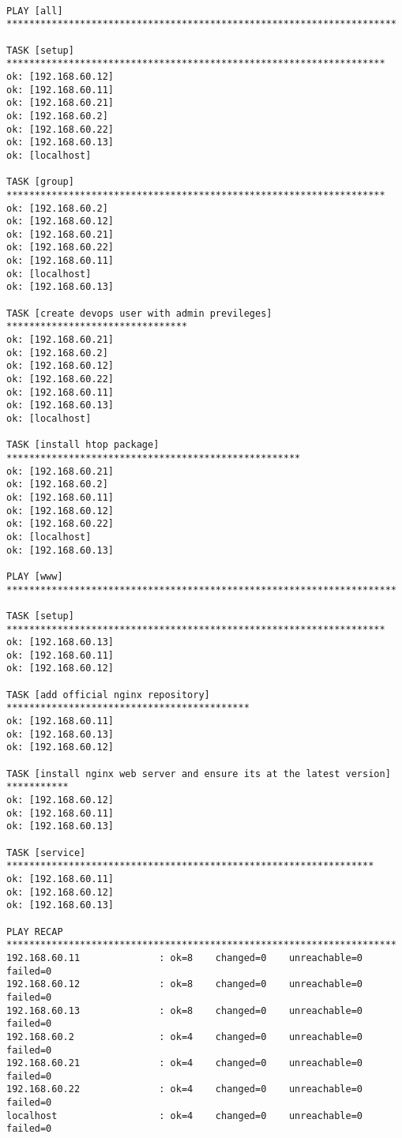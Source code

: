 \documentclass[11pt]{article}
\begin{document}
    \begin{Verbatim}[commandchars=\\\{\}]

PLAY [all] *********************************************************************

TASK [setup] *******************************************************************
ok: [192.168.60.12]
ok: [192.168.60.11]
ok: [192.168.60.21]
ok: [192.168.60.2]
ok: [192.168.60.22]
ok: [192.168.60.13]
ok: [localhost]

TASK [group] *******************************************************************
ok: [192.168.60.2]
ok: [192.168.60.12]
ok: [192.168.60.21]
ok: [192.168.60.22]
ok: [192.168.60.11]
ok: [localhost]
ok: [192.168.60.13]

TASK [create devops user with admin previleges] ********************************
ok: [192.168.60.21]
ok: [192.168.60.2]
ok: [192.168.60.12]
ok: [192.168.60.22]
ok: [192.168.60.11]
ok: [192.168.60.13]
ok: [localhost]

TASK [install htop package] ****************************************************
ok: [192.168.60.21]
ok: [192.168.60.2]
ok: [192.168.60.11]
ok: [192.168.60.12]
ok: [192.168.60.22]
ok: [localhost]
ok: [192.168.60.13]

PLAY [www] *********************************************************************

TASK [setup] *******************************************************************
ok: [192.168.60.13]
ok: [192.168.60.11]
ok: [192.168.60.12]

TASK [add official nginx repository] *******************************************
ok: [192.168.60.11]
ok: [192.168.60.13]
ok: [192.168.60.12]

TASK [install nginx web server and ensure its at the latest version] ***********
ok: [192.168.60.12]
ok: [192.168.60.11]
ok: [192.168.60.13]

TASK [service] *****************************************************************
ok: [192.168.60.11]
ok: [192.168.60.12]
ok: [192.168.60.13]

PLAY RECAP *********************************************************************
192.168.60.11              : ok=8    changed=0    unreachable=0    failed=0   
192.168.60.12              : ok=8    changed=0    unreachable=0    failed=0   
192.168.60.13              : ok=8    changed=0    unreachable=0    failed=0   
192.168.60.2               : ok=4    changed=0    unreachable=0    failed=0   
192.168.60.21              : ok=4    changed=0    unreachable=0    failed=0   
192.168.60.22              : ok=4    changed=0    unreachable=0    failed=0   
localhost                  : ok=4    changed=0    unreachable=0    failed=0   


    \end{Verbatim}


    
    
    
    
\end{document}

